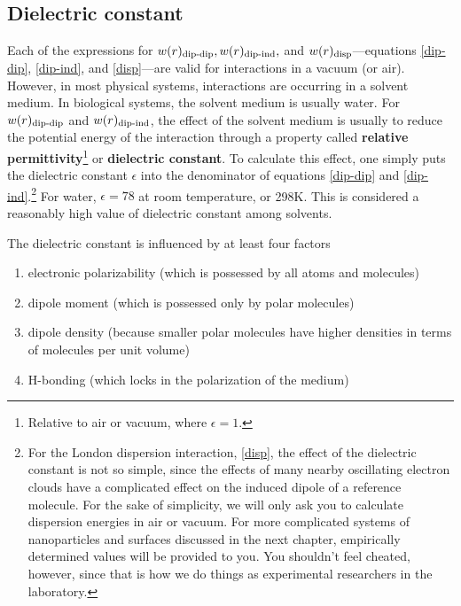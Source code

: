     \subsection{Dielectric constant} 

    Each of the expressions for $w(r)\textsubscript{dip-dip}, w(r)\textsubscript{dip-ind},$ and $w(r)\textsubscript{disp}$---equations \eqref{dip-dip}, \eqref{dip-ind}, and \eqref{disp}---are valid for interactions in a vacuum (or air). However, in most physical systems, interactions are occurring in a solvent medium. In biological systems, the solvent medium is usually water. For $w(r)\textsubscript{dip-dip}$ and $w(r)\textsubscript{dip-ind}$, the effect of the solvent medium is usually to reduce the potential energy of the interaction through a property called \textbf{relative permittivity}\footnote{Relative to air or vacuum, where $\epsilon=1$.} or \textbf{dielectric constant}. To calculate this effect, one simply puts the dielectric constant $\epsilon$ into the denominator of equations \eqref{dip-dip} and \eqref{dip-ind}.\footnote{For the London dispersion interaction, \eqref{disp}, the effect of the dielectric constant is not so simple, since the effects of many nearby oscillating electron clouds have a complicated effect on the induced dipole of a reference molecule. For the sake of simplicity, we will only ask you to calculate dispersion energies in air or vacuum. For more complicated systems of nanoparticles and surfaces discussed in the next chapter, empirically determined values will be provided to you. You shouldn't feel cheated, however, since that is how we do things as experimental researchers in the laboratory.} For water, $\epsilon=78$ at room temperature, or 298K. This is considered a reasonably high value of dielectric constant among solvents. 

    The dielectric constant is influenced by at least four factors

    \begin{enumerate}
        \item electronic polarizability (which is possessed by all atoms and molecules)
        \item dipole moment (which is possessed only by polar molecules)
        \item dipole density (because smaller polar molecules have higher densities in terms of molecules per unit volume)
        \item H-bonding (which locks in the polarization of the medium)
    \end{enumerate} 
    
